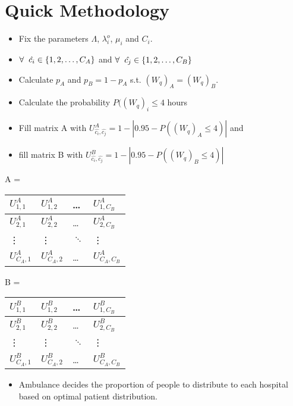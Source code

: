 \section{Quick Methodology}

\begin{itemize}
    \item Fix the parameters \( \Lambda \), \( \lambda_i^o \), \( \mu_i \) and 
    \( C_i \). 
    \item \( \forall \hspace{0.2cm} \hat{c_i} \in \{1,2, \dots, C_A\} \) and 
    \( \forall \hspace{0.2cm} \hat{c_j} \in \{1,2, \dots, C_B\} \) 
    \item Calculate \( p_A \) and \( p_B = 1-p_A \) s.t. \( (W_q)_A = (W_q)_B \). 
    \item Calculate the probability \(P((W_q)_i \leq 4 \) hours
    \item Fill matrix A with \( U_{\hat{c_i}, \hat{c_j}}^A = 
    1 - |0.95 - P((W_q)_A \leq 4)| \) and
    \item fill matrix B with \( U_{\hat{c_i}, \hat{c_j}}^B = 
    1 - |0.95 - P((W_q)_B \leq 4)| \)
\end{itemize}


\begin{table}[h]
    \centering
    A = 
    \begin{tabular}{|l|l|l|l|}
    \hline
    \( U_{1,1}^A \) & \( U_{1,2}^A \) & \dots & \( U_{1,C_B}^A \) \\ \hline
    \( U_{2,1}^A \) & \( U_{2,2}^A \) & \dots & \( U_{2,C_B}^A \) \\ \hline
    \vdots & \vdots & \( \ddots \) & \vdots \\ \hline
    \( U_{C_A,1}^A \) & \( U_{C_A,2}^A \) & \dots & \( U_{C_A,C_B}^A \) \\ \hline
    \end{tabular}
\end{table}  

\begin{table}[h]
    \centering
    B = 
    \begin{tabular}{|l|l|l|l|}
    \hline
    \( U_{1,1}^B \) & \( U_{1,2}^B \) & \dots & \( U_{1,C_B}^B \) \\ \hline
    \( U_{2,1}^B \) & \( U_{2,2}^B \) & \dots & \( U_{2,C_B}^B \) \\ \hline
    \vdots & \vdots & \( \ddots \) & \vdots \\ \hline
    \( U_{C_A,1}^B \) & \( U_{C_A,2}^B \) & \dots & \( U_{C_A,C_B}^B \) \\ \hline
    \end{tabular}
\end{table}  

\begin{itemize}
    \item Ambulance decides the proportion of people to distribute to each hospital 
    based on optimal patient distribution.
\end{itemize}
